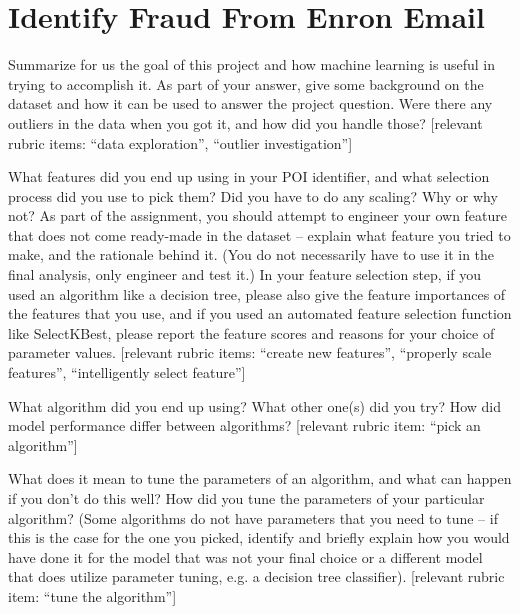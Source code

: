\documentclass[twoside,openright,titlepage,numbers=noenddot,headinclude,%
               footinclude=true,cleardoublepage=empty,abstractoff,BCOR=5mm,%
               paper=a4,fontsize=11pt,ngerman,american]{scrreprt}
\numberwithin{theorem}{chapter}
\numberwithin{definition}{chapter}
\numberwithin{algorithm}{chapter}
\numberwithin{figure}{chapter}
\numberwithin{table}{chapter}
\numberwithin{equation}{chapter}
\begin{document}
\frenchspacing
\raggedbottom
{}
\pagestyle{plain}




\cleardoublepage

\chapter *{Identify Fraud From Enron Email}

Summarize for us the goal of this project and how machine learning is useful in trying to accomplish it. As part of your answer, give some background on the dataset and how it can be used to answer the project question. Were there any outliers in the data when you got it, and how did you handle those? [relevant rubric items: ``data exploration'', ``outlier investigation'']


What features did you end up using in your POI identifier, and what selection process did you use to pick them? Did you have to do any scaling? Why or why not? As part of the assignment, you should attempt to engineer your own feature that does not come ready-made in the dataset -- explain what feature you tried to make, and the rationale behind it. (You do not necessarily have to use it in the final analysis, only engineer and test it.) In your feature selection step, if you used an algorithm like a decision tree, please also give the feature importances of the features that you use, and if you used an automated feature selection function like SelectKBest, please report the feature scores and reasons for your choice of parameter values.  [relevant rubric items: ``create new features'', ``properly scale features'', ``intelligently select feature'']


What algorithm did you end up using? What other one(s) did you try? How did model performance differ between algorithms?  [relevant rubric item: ``pick an algorithm'']


What does it mean to tune the parameters of an algorithm, and what can happen if you don’t do this well?  How did you tune the parameters of your particular algorithm? (Some algorithms do not have parameters that you need to tune -- if this is the case for the one you picked, identify and briefly explain how you would have done it for the model that was not your final choice or a different model that does utilize parameter tuning, e.g. a decision tree classifier).  [relevant rubric item: ``tune the algorithm'']
\end{document}
